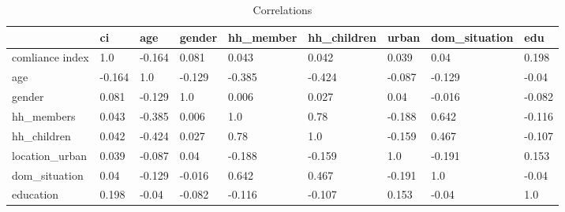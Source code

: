 \documentclass{article}
\begin{document}
\begin{table}[h]
\centering
\caption{Correlations}
\label{table:correlations}
\begin{tabular}{lllllllll}
\hline
                       & ci    & age    & gender & hh\_member & hh\_children & urban & dom\_situation & edu \\ \hline
comliance index                    & 1.0    & -0.164 & 0.081  & 0.043       & 0.042               & 0.039                  & 0.04                  & 0.198      \\
age                    & -0.164 & 1.0    & -0.129 & -0.385      & -0.424              & -0.087                 & -0.129                & -0.04      \\
gender                 & 0.081  & -0.129 & 1.0    & 0.006       & 0.027               & 0.04                   & -0.016                & -0.082     \\
hh\_members            & 0.043  & -0.385 & 0.006  & 1.0         & 0.78                & -0.188                 & 0.642                 & -0.116     \\
hh\_children    & 0.042  & -0.424 & 0.027  & 0.78        & 1.0                 & -0.159                 & 0.467                 & -0.107     \\
location\_urban & 0.039  & -0.087 & 0.04   & -0.188      & -0.159              & 1.0                    & -0.191                & 0.153      \\
dom\_situation  & 0.04   & -0.129 & -0.016 & 0.642       & 0.467               & -0.191                 & 1.0                   & -0.04      \\
education             & 0.198  & -0.04  & -0.082 & -0.116      & -0.107              & 0.153                  & -0.04                 & 1.0        \\ \hline
\end{tabular}
\end{table}
\end{document}
